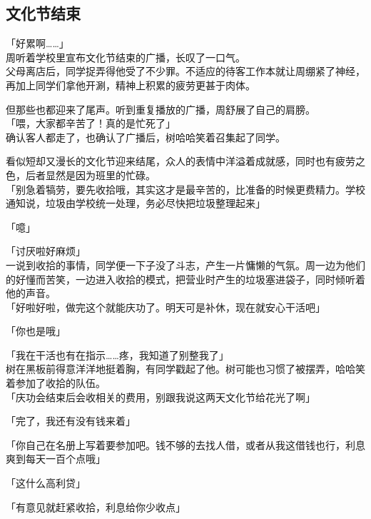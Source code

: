 \subsection{文化节结束}

「好累啊……」\\

周听着学校里宣布文化节结束的广播，长叹了一口气。\\

父母离店后，同学捉弄得他受了不少罪。不适应的待客工作本就让周绷紧了神经，再加上同学们拿他开涮，精神上积累的疲劳更甚于肉体。

但那些也都迎来了尾声。听到重复播放的广播，周舒展了自己的肩膀。\\

「喂，大家都辛苦了！真的是忙死了」\\

确认客人都走了，也确认了广播后，树哈哈笑着召集起了同学。

看似短却又漫长的文化节迎来结尾，众人的表情中洋溢着成就感，同时也有疲劳之色，后者显然是因为班里的忙碌。\\

「别急着犒劳，要先收拾哦，其实这才是最辛苦的，比准备的时候更费精力。学校通知说，垃圾由学校统一处理，务必尽快把垃圾整理起来」

「噫」

「讨厌啦好麻烦」\\

一说到收拾的事情，同学便一下子没了斗志，产生一片慵懒的气氛。周一边为他们的好懂而苦笑，一边进入收拾的模式，把营业时产生的垃圾塞进袋子，同时倾听着他的声音。\\

「好啦好啦，做完这个就能庆功了。明天可是补休，现在就安心干活吧」

「你也是哦」

「我在干活也有在指示……疼，我知道了别整我了」\\

树在黑板前得意洋洋地挺着胸，有同学戳起了他。树可能也习惯了被摆弄，哈哈笑着参加了收拾的队伍。\\

「庆功会结束后会收相关的费用，别跟我说这两天文化节给花光了啊」

「完了，我还有没有钱来着」

「你自己在名册上写着要参加吧。钱不够的去找人借，或者从我这借钱也行，利息爽到每天一百个点哦」

「这什么高利贷」

「有意见就赶紧收拾，利息给你少收点」

